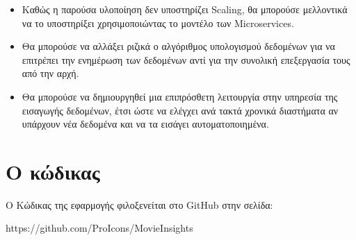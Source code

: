 \begin{itemize}
    \item Καθώς η παρούσα υλοποίηση δεν υποστηρίζει Scaling, θα μπορούσε μελλοντικά να το υποστηρίξει χρησιμοποιώντας το μοντέλο των Microservices. 
    \item Θα μπορούσε να αλλάξει ριζικά ο αλγόριθμος υπολογισμού δεδομένων για να επιτρέπει την ενημέρωση των δεδομένων αντί για την συνολική επεξεργασία τους από την αρχή.
    \item Θα μπορούσε να δημιουργηθεί μια επιπρόσθετη λειτουργία στην υπηρεσία της εισαγωγής δεδομένων, έτσι ώστε να ελέγχει ανά τακτά χρονικά διαστήματα αν υπάρχουν νέα δεδομένα και να τα εισάγει αυτοματοποιημένα.
\end{itemize}

\section{Ο κώδικας}
Ο Κώδικας της εφαρμογής φιλοξενείται στο GitHub στην σελίδα: 

https://github.com/ProIcons/MovieInsights

